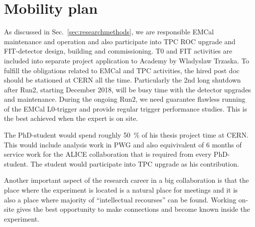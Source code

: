 \section{Mobility plan}%
\label{sec:mobility}

As discussed in Sec.~\ref{sec:researchmethods}, we are responsible EMCal maintenance and operation and also participate into TPC ROC upgrade and FIT-detector design, building and commissioning. T0 and FIT activities are included into separate project application to Academy by Wladyslaw Trzaska. To fulfill the obligations related to EMCal and TPC activities, the hired post doc should be stationed at CERN all the time. Particularly the 2nd long shutdown after Run2, starting December 2018, will be busy time with the detector upgrades and maintenance. During the ongoing Run2, we need guarantee flawless running of the EMCal L0-trigger and provide regular trigger performance studies. This is the best achieved when the expert is on site.

The PhD-student would spend roughly 50~\% of his thesis project time at CERN. This would include analysis work in PWG and also equivivalent of 6 months of service work for the ALICE collaboration that is required from every PhD-student. The student would participate into TPC upgrade as his contribution.

Another important aspect of the research career in a big collaboration is that the place where the experiment is located is a natural place for meetings and it is also a place where majority of ``intellectual recourses'' can be found. Working on-site gives the best opportunity to make connections and become known inside the experiment.

\nopagebreak
